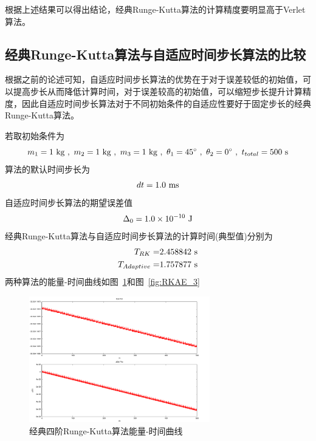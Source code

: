\documentclass[a4paper,12pt,titlepage]{article}
\begin{document}
根据上述结果可以得出结论，经典Runge-Kutta算法的计算精度要明显高于Verlet算法。

\subsection{经典Runge-Kutta算法与自适应时间步长算法的比较}
根据之前的论述可知，自适应时间步长算法的优势在于对于误差较低的初始值，可以提高步长从而降低计算时间，对于误差较高的初始值，可以缩短步长提升计算精度，因此自适应时间步长算法对于不同初始条件的自适应性要好于固定步长的经典Runge-Kutta算法。

若取初始条件为
\begin{equation}
	m_1=1~\mathrm{kg} ~,~ m_2=1~\mathrm{kg} ~,~ m_3=1~\mathrm{kg} ~,~ \theta_1=45^{\circ} ~,~ \theta_2=0^{\circ} ~,~ t_{total}=500 ~\mathrm{s} \notag
\end{equation}
算法的默认时间步长为
\begin{equation}
	dt=1.0 ~\mathrm{ms}\notag
\end{equation}
自适应时间步长算法的期望误差值
\begin{equation}
	\Delta_0=1.0\times 10^{-10} ~\mathrm{J}\notag
\end{equation}
经典Runge-Kutta算法与自适应时间步长算法的计算时间(典型值)分别为
\begin{align}
	T_{RK}=&2.458842 ~\mathrm{s}\notag \\
	T_{Adaptive}=&1.757877 ~\mathrm{s}\notag
\end{align}
两种算法的能量-时间曲线如图~\ref{fig:RKE_3}和图~\ref{fig:RKAE_3}
\begin{figure}[H]
\centering
\includegraphics[width=0.7\textwidth]{./RKE_3.pdf}
\caption[Caption for LOF]{经典四阶Runge-Kutta算法能量-时间曲线}
\label{fig:RKE_3}
\end{figure}
\end{document}
